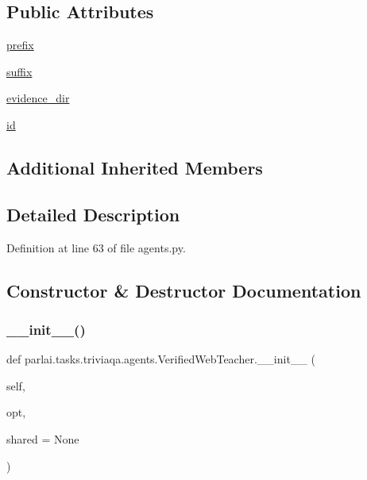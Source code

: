 \subsection*{Public Attributes}
\begin{DoxyCompactItemize}
\item 
\hyperlink{classparlai_1_1tasks_1_1triviaqa_1_1agents_1_1VerifiedWebTeacher_a87ba370cc7703d6d0674576f12bd374d}{prefix}
\item 
\hyperlink{classparlai_1_1tasks_1_1triviaqa_1_1agents_1_1VerifiedWebTeacher_a664ec91ac0757abaaf6853ea939232e4}{suffix}
\item 
\hyperlink{classparlai_1_1tasks_1_1triviaqa_1_1agents_1_1VerifiedWebTeacher_a6c7349009918dcbbfc17f930458e8698}{evidence\+\_\+dir}
\item 
\hyperlink{classparlai_1_1tasks_1_1triviaqa_1_1agents_1_1VerifiedWebTeacher_a482a09c00640e0bc928c2f8f9b1e20a1}{id}
\end{DoxyCompactItemize}
\subsection*{Additional Inherited Members}


\subsection{Detailed Description}


Definition at line 63 of file agents.\+py.



\subsection{Constructor \& Destructor Documentation}
\mbox{\label{classparlai_1_1tasks_1_1triviaqa_1_1agents_1_1VerifiedWebTeacher_a24150c529859f238cecd45835b93111a}} 
\subsubsection{\texorpdfstring{\+\_\+\+\_\+init\+\_\+\+\_\+()}{\_\_init\_\_()}}
{\footnotesize\ttfamily def parlai.\+tasks.\+triviaqa.\+agents.\+Verified\+Web\+Teacher.\+\_\+\+\_\+init\+\_\+\+\_\+ (\begin{DoxyParamCaption}\item[{}]{self,  }\item[{}]{opt,  }\item[{}]{shared = {\ttfamily None} }\end{DoxyParamCaption})}



